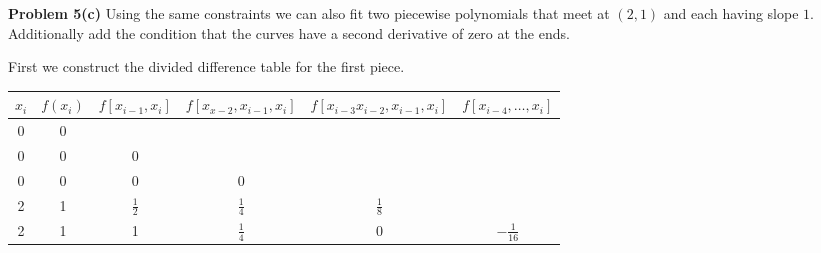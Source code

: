 \documentclass[12pt]{article}
\newcommand{\problem}[1]{\hspace{-4 ex} \large \textbf{Problem #1} }
\begin{document}
\problem{5(c)} Using the same constraints we can also fit two piecewise polynomials that meet at $(2,1)$ and each having slope $1$. Additionally add the condition that the curves have a second derivative of zero at the ends.

	First we construct the divided difference table for the first piece.
	\begin{center}
		\begin{tabular}{|c|c|c|c|c|c|}\hline
			$x_i$ & $f(x_i)$ & $f[x_{i-1},x_i]$ & $f[x_{x-2}, x_{i-1}, x_i]$ & $f[ x_{i-3}x_{i-2}, x_{i-1}, x_i]$ & $f[ x_{i-4},\dots, x_i]$ \\ \hline
			0 & 0 & & & & \\ \hline
			0 & 0 & 0 & & & \\ \hline
			0 & 0 & 0 & 0 & & \\ \hline
			2 & 1 & $\tfrac{1}{2}$ & $\tfrac{1}{4}$ & $\tfrac{1}{8}$ & \\ \hline
			2 & 1 & 1 &  $\tfrac{1}{4}$ & 0 & $-\tfrac{1}{16}$ \\ \hline
		\end{tabular}
	\end{center}
	
\end{document}
